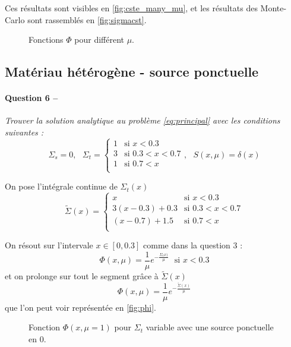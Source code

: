 \documentclass[11pt,a4paper]{article}
\newcommand{\question}[2]{\paragraph{Question #1 --}\hspace{-7pt}\textit{#2} \\}
\newcommand{\intsigma}{\widetilde{\Sigma}}
\begin{document}
Ces résultats sont visibles en \autoref{fig:cste_many_mu}, et les résultats des Monte-Carlo sont rassemblés en \autoref{fig:sigmacst}.
\begin{figure}
  \centering
  \caption{Fonctions $\Phi$ pour différent $\mu$.}
  \label{fig:cste_many_mu}
\end{figure}

\subsection{Matériau hétérogène - source ponctuelle}

\question{6}{Trouver la solution analytique au problème \autoref{eq:principal} avec les conditions suivantes :}

\begin{equation}
  \Sigma_s=0, ~~~
  \Sigma_t =
  \begin{cases}
    1 &\mbox{si } x<0.3 \\
    3 &\mbox{si } 0.3<x<0.7 \\
    1 &\mbox{si } 0.7<x \\
  \end{cases}
  , ~~~ S(x, \mu) = \delta(x)
\end{equation}

On pose l'intégrale continue de $\Sigma_t(x)$ 
\begin{equation}
  \intsigma(x) =
  \begin{cases}
    x &\mbox{si } x<0.3 \\
    3(x-0.3)+0.3 &\mbox{si } 0.3<x<0.7 \\
    (x-0.7)+1.5 &\mbox{si } 0.7<x \\
  \end{cases}
\end{equation}

On résout sur l'intervale $x\in[0,0.3]$ comme dans la question 3 :
\begin{equation}
  \Phi(x, \mu) = \frac{1}{\mu} e^{-\frac{\Sigma_t x)}{\mu}} ~~~ \mbox{si } x<0.3
\end{equation}
et on prolonge sur tout le segment grâce à $\intsigma(x)$ 
\begin{equation}
  \Phi(x, \mu) = \frac{1}{\mu} e^{-\frac{\intsigma(x)}{\mu}} 
\end{equation}
que l'on peut voir représentée en \autoref{fig:phi}.

\begin{figure}
  \centering
  \caption{Fonction $\Phi(x, \mu=1)$ pour $\Sigma_t$ variable avec une source ponctuelle en 0.}
  \label{fig:phi}
\end{figure}
\end{document}
